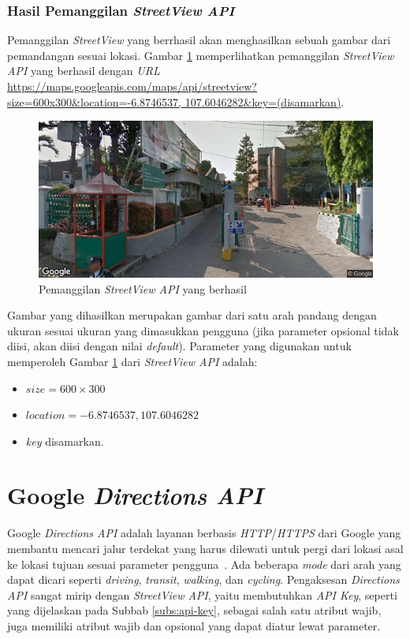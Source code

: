 \subsubsection{Hasil Pemanggilan \textit{StreetView API}}
Pemanggilan \textit{StreetView} yang berrhasil akan menghasilkan sebuah gambar dari pemandangan sesuai lokasi. Gambar \ref{fig:success-streetview} memperlihatkan pemanggilan \textit{StreetView API} yang berhasil dengan \textit{URL} \url{https://maps.googleapis.com/maps/api/streetview?size=600x300\&location=-6.8746537,
107.6046282\&key=(disamarkan)}.
\begin{figure}[h]
		\includegraphics[scale=0.8]{Gambar/streetview90.png}
	\caption{Pemanggilan \textit{StreetView API} yang berhasil}
	\label{fig:success-streetview}
\end{figure}

Gambar yang dihasilkan merupakan gambar dari satu arah pandang dengan ukuran sesuai ukuran yang dimasukkan pengguna (jika parameter opsional tidak diisi, akan diisi dengan nilai \textit{default}). Parameter yang digunakan untuk memperoleh Gambar \ref{fig:success-streetview} dari \textit{StreetView API} adalah:
	\begin{itemize}
		\item $size = 600\times300$
		\item $location = -6.8746537,
107.6046282$
		\item \textit{key} disamarkan.
	\end{itemize}

\section{Google {\it Directions API}}
\label{sec:directions}
Google {\it Directions API} adalah layanan berbasis \textit{HTTP}/\textit{HTTPS} dari Google yang membantu mencari jalur terdekat yang harus dilewati untuk pergi dari lokasi asal ke lokasi tujuan sesuai parameter pengguna~\cite{directions-api}. Ada beberapa \textit{mode} dari arah yang dapat dicari seperti {\it driving}, {\it transit}, {\it walking}, dan {\it cycling}. Pengaksesan \textit{Directions API} sangat mirip dengan {\it StreetView API}, yaitu membutuhkan \textit{API Key}, seperti yang dijelaskan pada Subbab \ref{subs:api-key}, sebagai salah satu atribut wajib, juga memiliki atribut wajib dan opsional yang dapat diatur lewat parameter. 

